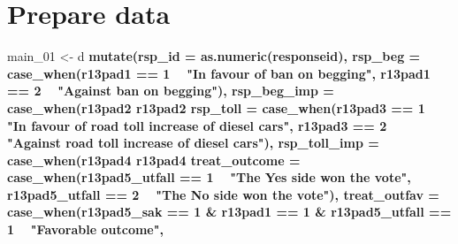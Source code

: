 \documentclass[]{book}
\newenvironment{Shaded}{\begin{snugshade}}{\end{snugshade}}
\newcommand{\KeywordTok}[1]{\textcolor[rgb]{0.13,0.29,0.53}{\textbf{#1}}}
\newcommand{\DataTypeTok}[1]{\textcolor[rgb]{0.13,0.29,0.53}{#1}}
\newcommand{\DecValTok}[1]{\textcolor[rgb]{0.00,0.00,0.81}{#1}}
\newcommand{\StringTok}[1]{\textcolor[rgb]{0.31,0.60,0.02}{#1}}
\newcommand{\OperatorTok}[1]{\textcolor[rgb]{0.81,0.36,0.00}{\textbf{#1}}}
\newcommand{\NormalTok}[1]{#1}
\begin{document}
\section{Prepare data}\label{prepare-data-6}

\begin{Shaded}
\begin{Highlighting}[]
\NormalTok{main_}\DecValTok{01}\NormalTok{ <-}\StringTok{ }\NormalTok{d }\OperatorTok{%>%}\StringTok{ }
\StringTok{  }\KeywordTok{mutate}\NormalTok{(}\DataTypeTok{rsp_id =} \KeywordTok{as.numeric}\NormalTok{(responseid),}
         \DataTypeTok{rsp_beg =} \KeywordTok{case_when}\NormalTok{(r13pad1 }\OperatorTok{==}\StringTok{ }\DecValTok{1} \OperatorTok{~}\StringTok{ "In favour of ban on begging"}\NormalTok{,}
\NormalTok{                             r13pad1 }\OperatorTok{==}\StringTok{ }\DecValTok{2} \OperatorTok{~}\StringTok{ "Against ban on begging"}\NormalTok{),}
         \DataTypeTok{rsp_beg_imp =} \KeywordTok{case_when}\NormalTok{(r13pad2 }\OperatorTok{%in%}\StringTok{ }\DecValTok{1}\OperatorTok{:}\DecValTok{2} \OperatorTok{~}\StringTok{ "Important"}\NormalTok{,}
\NormalTok{                                  r13pad2 }\OperatorTok{%in%}\StringTok{ }\DecValTok{3}\OperatorTok{:}\DecValTok{5} \OperatorTok{~}\StringTok{ "Not important"}\NormalTok{),}
         \DataTypeTok{rsp_toll =} \KeywordTok{case_when}\NormalTok{(r13pad3 }\OperatorTok{==}\StringTok{ }\DecValTok{1} \OperatorTok{~}\StringTok{ "In favour of road toll increase of diesel cars"}\NormalTok{,}
\NormalTok{                              r13pad3 }\OperatorTok{==}\StringTok{ }\DecValTok{2} \OperatorTok{~}\StringTok{ "Against road toll increase of diesel cars"}\NormalTok{),}
         \DataTypeTok{rsp_toll_imp =} \KeywordTok{case_when}\NormalTok{(r13pad4 }\OperatorTok{%in%}\StringTok{ }\DecValTok{1}\OperatorTok{:}\DecValTok{2} \OperatorTok{~}\StringTok{ "Important"}\NormalTok{,}
\NormalTok{                                  r13pad4 }\OperatorTok{%in%}\StringTok{ }\DecValTok{3}\OperatorTok{:}\DecValTok{5} \OperatorTok{~}\StringTok{ "Not important"}\NormalTok{),}
         \DataTypeTok{treat_outcome =} \KeywordTok{case_when}\NormalTok{(r13pad5_utfall }\OperatorTok{==}\StringTok{ }\DecValTok{1} \OperatorTok{~}\StringTok{ "The Yes side won the vote"}\NormalTok{,}
\NormalTok{                                 r13pad5_utfall }\OperatorTok{==}\StringTok{ }\DecValTok{2} \OperatorTok{~}\StringTok{ "The No side won the vote"}\NormalTok{),}
        \DataTypeTok{treat_outfav =} \KeywordTok{case_when}\NormalTok{(r13pad5_sak }\OperatorTok{==}\StringTok{ }\DecValTok{1} \OperatorTok{&}\StringTok{ }\NormalTok{r13pad1 }\OperatorTok{==}\StringTok{ }\DecValTok{1} \OperatorTok{&}\StringTok{ }\NormalTok{r13pad5_utfall }\OperatorTok{==}\StringTok{ }\DecValTok{1} \OperatorTok{~}\StringTok{ "Favorable outcome"}\NormalTok{,}
}}}}}
\end{Highlighting}
\end{Shaded}
\end{document}
